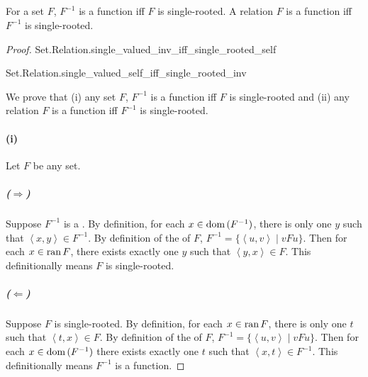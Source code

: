 \documentclass{report}
\begin{document}
\subsection{}%
\label{sub:theorem-3f}

\begin{theorem}[3F]

  For a set $F$, $F^{-1}$ is a function iff $F$ is single-rooted.
  A relation $F$ is a function iff $F^{-1}$ is single-rooted.

\end{theorem}

\begin{proof}

  \statementpadding

    {Set.Relation.single\_valued\_inv\_iff\_single\_rooted\_self}

    {Set.Relation.single\_valued\_self\_iff\_single\_rooted\_inv}

  We prove that (i) any set $F$, $F^{-1}$ is a function iff $F$ is
    single-rooted and (ii) any relation $F$ is a function iff $F^{-1}$ is
    single-rooted.

  \paragraph{(i)}%
  \label{par:theorem-3f-i}

    Let $F$ be any set.

    \subparagraph{($\Rightarrow$)}%

      Suppose $F^{-1}$ is a .
      By definition, for each $x \in \mathop{\text{dom}}{(F^{-1})}$, there is only one $y$
        such that $\left< x, y \right> \in F^{-1}$.
      By definition of the  of $F$,
        $F^{-1} = \{\left< u, v \right> \mid vFu\}$.
      Then for each $x \in \mathop{\text{ran}}{F}$, there exists exactly one $y$ such that
        $\left< y, x \right> \in F$.
      This definitionally means $F$ is single-rooted.

    \subparagraph{($\Leftarrow$)}%

      Suppose $F$ is single-rooted.
      By definition, for each $x \in \mathop{\text{ran}}{F}$, there is only one $t$ such that
        $\left< t, x \right> \in F$.
      By definition of the  of $F$,
        $F^{-1} = \{\left< u, v \right> \mid vFu\}$.
      Then for each $x \in \mathop{\text{dom}}{(F^{-1})}$ there exists exactly one $t$ such
        that $\left< x, t \right> \in F^{-1}$.
      This definitionally means $F^{-1}$ is a function.


\end{proof}
\end{document}
